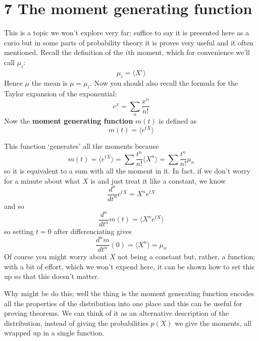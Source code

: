 \documentclass[11pt,a4paper]{scrartcl}
\begin{document}
\section*{7 The moment generating function}

This is a topic we won't explore very far; suffice to say it is
presented here as a curio but in some parts of probability theory it
is proves very useful and it often mentioned. Recall the definition of the $i$th moment, which for convenience we'll call $\mu_i$:
\begin{equation}
\mu_i=\langle X^i\rangle
\end{equation}
Hence $\mu$ the mean is $\mu=\mu_i$. Now you should also recall the
formula for the Taylor expansion of the exponential:
\begin{equation}
e^x=\sum_n \frac{x^n}{n!}
\end{equation}
Now the \textbf{moment generating function} $m(t)$ is defined as
\begin{equation}
m(t)=\langle e^{tX}\rangle
\end{equation}

This function \lq{}generates\rq{} all the moments because 
\begin{equation}
m(t)=\langle e^{tX}\rangle=\sum \frac{t^n}{n!}\langle X^n\rangle =\sum \frac{t^n}{n!}\mu_n
\end{equation}
so it is equivalent to a sum with all the moment in it. In fact, if we
don't worry for a minute about what $X$ is and just treat it like a
constant, we know
\begin{equation}
\frac{d^n}{dt^n}e^{tX}=X^ne^{tX}
\end{equation}
and so
\begin{equation}
\frac{d^n}{dt^n}m(t)=\langle X^ne^{tX}\rangle
\end{equation}
so setting $t=0$ after differenciating gives
\begin{equation}
\frac{d^nm}{dt^n}(0)=\langle X^n\rangle=\mu_n
\end{equation}
Of course you might worry about $X$ not being a constant but, rather,
a function; with a bit of effort, which we won't expend here, it can
be shown how to set this up so that this doesn't matter.

Why might be do this; well the thing is the moment generating function
encodes all the properties of the distribution into one place and this
can be useful for proving theorems. We can think of it as an
alternative description of the distribution, instead of giving the
probabilities $p(X)$ we give the moments, all wrapped up in a single
function.
\end{document}

